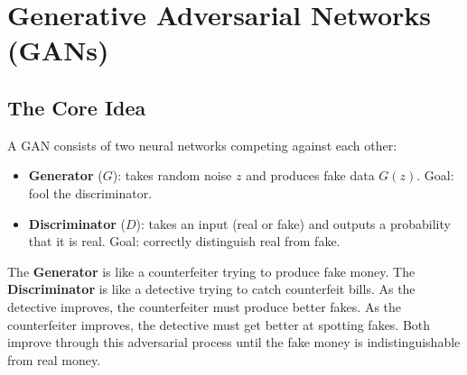\documentclass[11pt,a4paper]{article}
\begin{document}
\section{Generative Adversarial Networks (GANs)}

\subsection{The Core Idea}

A GAN consists of two neural networks competing against each other:

\begin{center}
\end{center}

\begin{itemize}[leftmargin=1.5em]
    \item \textbf{Generator} ($G$): takes random noise $z$ and produces fake data $G(z)$. Goal: fool the discriminator.
    \item \textbf{Discriminator} ($D$): takes an input (real or fake) and outputs a probability that it is real. Goal: correctly distinguish real from fake.
\end{itemize}

\begin{tcolorbox}[intuitionbox={The Counterfeiter Analogy}]
The \textbf{Generator} is like a counterfeiter trying to produce fake money. The \textbf{Discriminator} is like a detective trying to catch counterfeit bills. As the detective improves, the counterfeiter must produce better fakes. As the counterfeiter improves, the detective must get better at spotting fakes. Both improve through this adversarial process until the fake money is indistinguishable from real money.
\end{tcolorbox}
\end{document}
